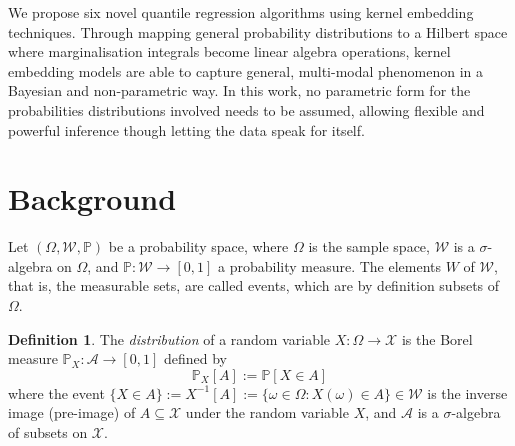 \documentclass[twoside]{article} \usepackage{aistats2017}
\theoremstyle{definition}
\newtheorem{definition}{Definition}[section]
\theoremstyle{theorem}
\newcommand{\rv}[1]{{#1}}
\begin{document}
	We propose six novel quantile regression algorithms using kernel embedding techniques. Through mapping general probability distributions to a Hilbert space where marginalisation integrals become linear algebra operations, kernel embedding models are able to capture general, multi-modal phenomenon in a Bayesian and non-parametric way. In this work, no parametric form for the probabilities distributions involved needs to be assumed, allowing flexible and powerful inference though letting the data speak for itself.

	
\newpage
\section{Background}
\label{sec:background}
	
	Let $(\Omega, \mathcal{W}, \mathbb{P})$ be a probability space, where $\Omega$ is the sample space, $\mathcal{W}$ is a $\sigma$-algebra on $\Omega$, and $\mathbb{P} : \mathcal{W} \to [0, 1]$ a probability measure. The elements $W$ of $\mathcal{W}$, that is, the measurable sets, are called events, which are by definition subsets of $\Omega$.
	
	\begin{definition} \label{def:distribution}
		\citep{bauer1981probability}
		The \textit{distribution} of a random variable $\rv{X} : \Omega \to \mathcal{X}$ is the Borel measure $\mathbb{P}_{\rv{X}} : \mathcal{A} \to [0, 1]$ defined by
		\begin{equation}
			\mathbb{P}_{\rv{X}}[A] := \mathbb{P}[\rv{X} \in A]
		\label{eq:distribution}
		\end{equation}
		where the event $\{\rv{X} \in A\} := \rv{X}^{-1}[A] := \{\omega \in \Omega : \rv{X}(\omega) \in A\} \in \mathcal{W}$ is the inverse image (pre-image) of $A \subseteq \mathcal{X}$ under the random variable $\rv{X}$, and $\mathcal{A}$ is a $\sigma$-algebra of subsets on $\mathcal{X}$.
	\end{definition}
	
\end{document}
